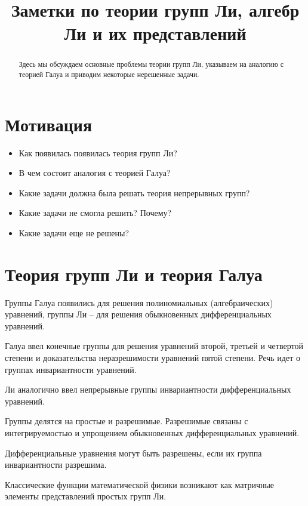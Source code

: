 \documentclass[12pt]{article}
\begin{document}
\title{Заметки по теории групп Ли, алгебр Ли и их представлений}

\maketitle

\begin{abstract}
  Здесь мы обсуждаем основные проблемы теории групп Ли, указываем на
  аналогию с теорией Галуа и приводим некоторые нерешенные задачи.
\end{abstract}

\section{Мотивация}
\begin{itemize}
\item Как появилась появилась теория групп Ли?
\item В чем состоит аналогия с теорией Галуа?
\item Какие задачи должна была решать теория непрерывных групп?
\item Какие задачи не смогла решить? Почему?
\item Какие задачи еще не решены?
\end{itemize}

\section{Теория групп Ли и теория Галуа}
\label{sec:galois}

Группы Галуа появились для решения полиномиальных (алгебраических)
уравнений, группы Ли -- для решения обыкновенных дифференциальных
уравнений. 

Галуа ввел конечные группы для решения уравнений второй, третьей и
четвертой степени и доказательства неразрешимости уравнений пятой
степени. Речь идет о группах инвариантности уравнений.




Ли аналогично ввел непрерывные группы инвариантности дифференциальных
уравнений.

Группы делятся на простые и разрешимые. Разрешимые связаны с
интегрируемостью и упрощением обыкновенных дифференциальных уравнений. 

Дифференциальные уравнения могут быть разрешены, если их группа
инвариантности разрешима. 

Классические функции математической физики возникают как матричные
элементы представлений простых групп Ли. 


{}

\end{document}
